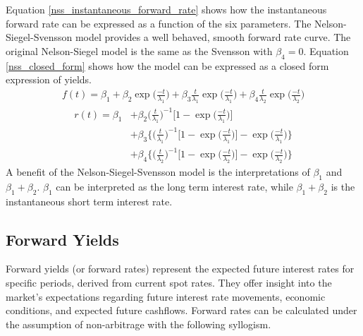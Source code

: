 \documentclass[11pt]{article}
\begin{document}
 Equation \eqref{nss_instantaneous_forward_rate} shows how the instantaneous forward rate can be expressed as a function of the six parameters. The Nelson-Siegel-Svensson model provides a well behaved, smooth forward rate curve. The original Nelson-Siegel model is the same as the Svensson with $\beta_4=0$. Equation \eqref{nss_closed_form} shows how the model can be expressed as a closed form expression of yields.
\begin{align}
	f(t)=\beta_1+\beta_2\exp\bigg(\frac{-t}{\lambda_1}\bigg)
			+\beta_3\frac{t}{\lambda_1}\exp\bigg(\frac{-t}{\lambda_1}\bigg)
			+\beta_4\frac{t}{\lambda_2}\exp\bigg(\frac{-t}{\lambda_2}\bigg)
			\label{nss_instantaneous_forward_rate}
\end{align}
\begin{align}
	r(t)=\beta_1&+\beta_2\bigg(\frac{t}{\lambda_1}\bigg)^{-1}\bigg[1-\exp\bigg(\frac{-t}{\lambda_1}\bigg)\bigg]\nonumber\\
		&+\beta_3\bigg\{\bigg(\frac{t}{\lambda_1}\bigg)^{-1}\bigg[1-\exp\bigg(\frac{-t}{\lambda_1}\bigg)\bigg]-\exp\bigg(\frac{-t}{\lambda_1}\bigg)\bigg\}\nonumber\\
		&+\beta_4\bigg\{\bigg(\frac{t}{\lambda_2}\bigg)^{-1}\bigg[1-\exp\bigg(\frac{-t}{\lambda_2}\bigg)\bigg]-\exp\bigg(\frac{-t}{\lambda_2}\bigg)\bigg\}
		\label{nss_closed_form}
\end{align}
A benefit of the Nelson-Siegel-Svensson model is the interpretations of $\beta_1$ and $\beta_1+\beta_2$. $\beta_1$ can be interpreted as the long term interest rate, while $\beta_1+\beta_2$ is the instantaneous short term interest rate.

 \subsection{Forward Yields}

Forward yields (or forward rates) represent the expected future interest rates for specific periods, derived from current spot rates. They offer insight into the market's expectations regarding future interest rate movements, economic conditions, and expected future cashflows. Forward rates can be calculated under the assumption of non-arbitrage with the following syllogism. 
\end{document}
